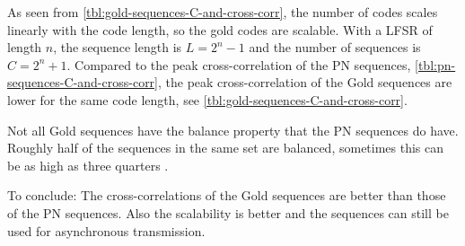 As seen from \autoref{tbl:gold-sequences-C-and-cross-corr}, the number of codes scales linearly with the code length, so the gold codes are scalable.
With a LFSR of length $n$, the sequence length is $L = 2^n - 1$ and the number of sequences is $C = 2^n + 1$.
Compared to the peak cross-correlation of the PN sequences, \autoref{tbl:pn-sequences-C-and-cross-corr}, the peak cross-correlation of the Gold sequences are lower for the same code length, see \autoref{tbl:gold-sequences-C-and-cross-corr}.





%
%
%
%		
%



Not all Gold sequences have the balance property that the PN sequences do have.
Roughly half of the sequences in the same set are balanced, sometimes this can be as high as three quarters \cite{holmes2007spread}.


To conclude: The cross-correlations of the Gold sequences are better than those of the PN sequences.
Also the scalability is better and the sequences can still be used for asynchronous transmission.
